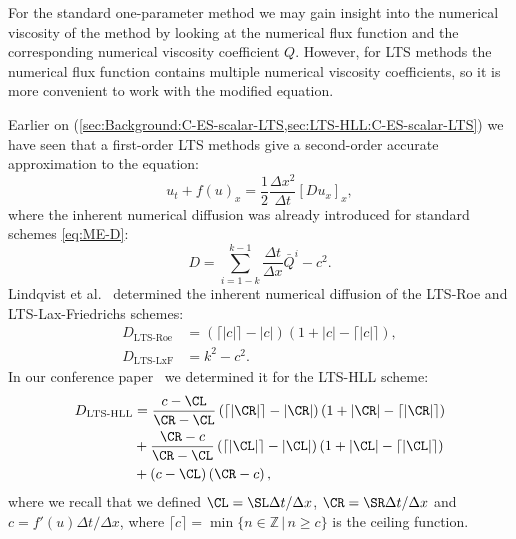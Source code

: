 For the standard one-parameter method we may gain insight into the numerical viscosity of the method by looking at the numerical flux function and the corresponding numerical viscosity coefficient $ Q $. However, for LTS methods the numerical flux function contains multiple numerical viscosity coefficients, so it is more convenient to work with the modified equation.

Earlier on (\cref{sec:Background:C-ES-scalar-LTS,sec:LTS-HLL:C-ES-scalar-LTS}) we have seen that a first-order LTS methods give a second-order accurate approximation to the equation:
\begin{equation} \label{eq:LTS-ME4}
u_t + f(u)_x = \frac{1}{2} \frac{\Delta x^2}{\Delta t} \left[ D u_x \right]_x,
\end{equation}
where the inherent numerical diffusion was already introduced for standard schemes \eqref{eq:ME-D}:
\begin{equation} \label{eq:LTS-ME-D}
D = \sum\limits_{i=1-k}^{k-1} \frac{\Delta t}{\Delta x} \bar{Q}^i - c^2.
\end{equation}
Lindqvist et al.~\cite{lin16} determined the inherent numerical diffusion of the LTS-Roe and LTS-Lax-Friedrichs schemes:
\begin{align}
D_\text{LTS-Roe} & = \left( \lceil |c| \rceil - |c| \right) \left( 1 + |c| - \lceil |c| \rceil \right), \label{eq:D-LTS-Roe} \\
D_\text{LTS-LxF} & = k^2 - c^2. \label{eq:D-LTS-LxF}
\end{align}
In our conference paper~\cite{cp2} we determined it for the LTS-HLL scheme:
\begin{align} \label{eq:D-LTS-HLL}
D_\text{LTS-HLL} & = \frac{c - \CL}{\CR - \CL} \left( \lceil |\CR| \rceil - |\CR| \right) \left( 1 + |\CR| - \lceil |\CR| \rceil \right) \notag \\ 
& + \frac{\CR - c}{\CR - \CL} \left( \lceil |\CL| \rceil - |\CL| \right) \left( 1 + |\CL| - \lceil |\CL| \rceil \right) \notag \\ 
& + \left( c - \CL \right) \left( \CR - c \right),
\end{align}
where we recall that we defined $ \CL = \SL \Delta t / \Delta x $, $ \CR = \SR \Delta t / \Delta x $ and \mbox{$ c = f'(u) \Delta t / \Delta x $}, where $ \lceil c \rceil = \min \{ n \in \mathbb{Z} \,| \, n \geq c \} $ is the ceiling function.

